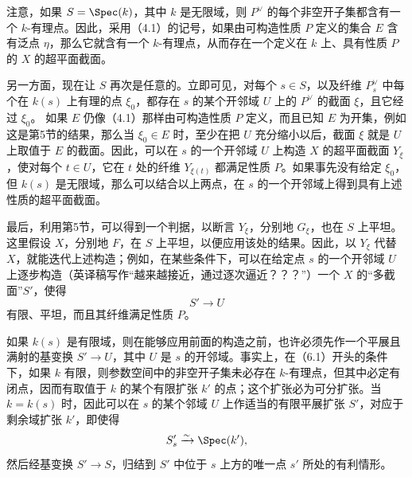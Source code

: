 
注意，如果 $S=\Spec(k)$，其中 $k$ 是无限域，则 $P^\vee$ 的每个非空开子集都含有一个 $k$-有理点。因此，采用（4.1）的记号，如果由可构造性质 $P$ 定义的集合 $E$ 含有泛点 $\eta$，那么它就含有一个 $k$-有理点，从而存在一个定义在 $k$ 上、具有性质 $P$ 的 $X$ 的超平面截面。

另一方面，现在让 $S$ 再次是任意的。立即可见，对每个 $s\in S$，以及纤维 $P_s^\vee$ 中每个在 $k(s)$ 上有理的点 $\xi_0$，都存在 $s$ 的某个开邻域 $U$ 上的 $P^\vee$ 的截面 $\xi$，且它经过 $\xi_0$。
如果 $E$ 仍像（4.1）那样由可构造性质 $P$ 定义，而且已知 $E$ 为开集，例如这是第5节的结果，那么当 $\xi_0\in E$ 时，至少在把 $U$ 充分缩小以后，截面 $\xi$ 就是 $U$ 上取值于 $E$ 的截面。因此，可以在 $s$ 的一个开邻域 $U$ 上构造 $X$ 的超平面截面 $Y_\xi$，使对每个 $t\in U$，它在 $t$ 处的纤维 $Y_{\xi(t)}$ 都满足性质 $P$。如果事先没有给定 $\xi_0$，但 $k(s)$ 是无限域，那么可以结合以上两点，在 $s$ 的一个开邻域上得到具有上述性质的超平面截面。

最后，利用第5节，可以得到一个判据，以断言 $Y_\xi$，分别地 $G_\xi$，也在 $S$ 上平坦。这里假设 $X$，分别地 $F$，在 $S$ 上平坦，以便应用该处的结果。因此，以 $Y_\xi$ 代替 $X$，就能迭代上述构造；例如，在某些条件下，可以在给定点 $s$ 的一个开邻域 $U$ 上逐步构造（英译稿写作“越来越接近，通过逐次逼近？？？”）一个 $X$ 的“多截面”$S'$，使得
\[
 S'\longrightarrow U
\]
有限、平坦，而且其纤维满足性质 $P$。

如果 $k(s)$ 是有限域，则在能够应用前面的构造之前，也许必须先作一个平展且满射的基变换 $S'\to U$，其中 $U$ 是 $s$ 的开邻域。事实上，在（6.1）开头的条件下，如果 $k$ 有限，则参数空间中的非空开子集未必存在 $k$-有理点，但其中必定有闭点，因而有取值于 $k$ 的某个有限扩张 $k'$ 的点；这个扩张必为可分扩张。当 $k=k(s)$ 时，因此可以在 $s$ 的某个邻域 $U$ 上作适当的有限平展扩张 $S'$，对应于剩余域扩张 $k'$，即使得
\[
 S'_s\xrightarrow{\sim}\Spec(k'),
\]
然后经基变换 $S'\to S$，归结到 $S'$ 中位于 $s$ 上方的唯一点 $s'$ 所处的有利情形。

